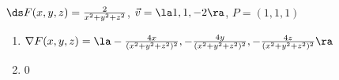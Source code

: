 {$\ds F(x,y,z) = \frac{2}{x^2+y^2+z^2}$, $\vec v = \la 1,1,-2\ra$, $P = (1,1,1)$
}
{
\begin{enumerate}
	\item $\nabla F(x,y,z) = \la -\frac{4x}{(x^2+y^2+z^2)^2},-\frac{4y}{(x^2+y^2+z^2)^2},-\frac{4z}{(x^2+y^2+z^2)^2}\ra$
	\item	$0$
\end{enumerate}
}